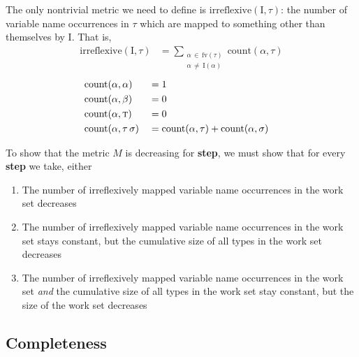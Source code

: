 \documentclass[10pt, letterpaper, oneside]{article}
\newcommand{\inertset}{\text{I}}
\newcommand{\fv}{\mathrm{fv}}
\begin{document}
The only nontrivial metric we need to define is \(\text{irreflexive}(\inertset, \tau)\): the number of variable name occurrences in \(\tau\) which are mapped to something other than themselves by \(\inertset\). That is,
\begin{align*}
  \text{irreflexive}(\inertset, \tau) &= \!\!\!\!\sum_{\substack{\alpha\,\in\,\fv(\tau)\\\alpha\,\ne\,\inertset(\alpha)}}\!\!\!\text{count}(\alpha, \tau)
\end{align*}
\begin{alignat*}{3}
  &\text{count}(\alpha, \alpha) &&= 1 &&\\
  &\text{count}(\alpha, \beta)  &&= 0 &&\\
  &\text{count}(\alpha, \text{\sc t}) &&= 0 &&\\
  &\text{count}(\alpha, \tau\,\sigma) &&= \text{count}(\alpha, \tau) + \text{count}(\alpha, \sigma) &&
\end{alignat*}

To show that the metric \(M\) is decreasing for \textbf{step}, we must show that for every \textbf{step} we take, either
\begin{enumerate}
\item The number of irreflexively mapped variable name occurrences in the work set decreases
\item The number of irreflexively mapped variable name occurrences in the work set stays constant, but the cumulative size of all types in the work set decreases
\item The number of irreflexively mapped variable name occurrences in the work set \emph{and} the cumulative size of all types in the work set stay constant, but the size of the work set decreases
\end{enumerate}



\subsection{Completeness}
\end{document}
